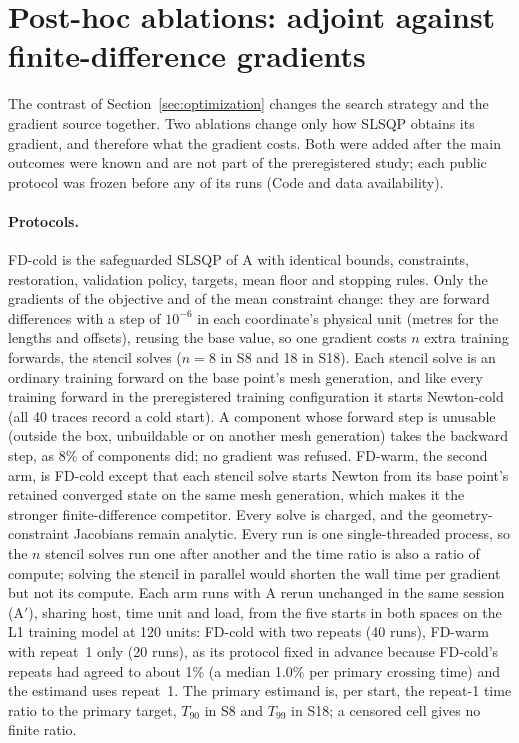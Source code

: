 \section{Post-hoc ablations: adjoint against finite-difference gradients}\label{sec:exp2-fd}
The contrast of Section~\ref{sec:optimization} changes the search strategy
and the gradient source together. Two ablations change only how SLSQP
obtains its gradient, and therefore what the gradient costs. Both were
added after the main outcomes were known and are not part of the
preregistered study; each public protocol was frozen before any of its
runs (Code and data availability).

\paragraph{Protocols.}
FD-cold is the safeguarded SLSQP of A with identical bounds, constraints,
restoration, validation policy, targets, mean floor and stopping rules.
Only the gradients of the objective and of the mean constraint change: they
are forward differences with a step of $10^{-6}$ in each coordinate's
physical unit (metres for the lengths and offsets), reusing the base value,
so one gradient costs $n$ extra training forwards, the stencil solves
($n=8$ in S8 and 18 in S18). Each stencil solve is an ordinary training
forward on the base point's mesh generation, and like every training
forward in the preregistered training configuration it starts Newton-cold
(all 40 traces record a cold start). A component whose forward step is
unusable (outside the box, unbuildable or on another mesh generation) takes
the backward step, as 8\% of components did; no gradient was refused.
FD-warm, the second arm, is FD-cold except that each stencil solve starts
Newton from its base point's retained converged state on the same mesh
generation, which makes it the stronger finite-difference competitor.
Every solve is charged, and the geometry-constraint Jacobians remain
analytic. Every run is one single-threaded process, so the $n$ stencil
solves run one after another and the time ratio is also a ratio of
compute; solving the stencil in parallel would shorten the wall time per
gradient but not its compute. Each arm runs with A rerun unchanged in the
same session (A$'$), sharing host, time unit and load, from the five starts
in both spaces on the L1 training model at 120 units: FD-cold with two
repeats (40 runs), FD-warm with repeat~1 only (20 runs), as its protocol
fixed in advance because FD-cold's repeats had agreed to about 1\% (a
median 1.0\% per primary crossing time) and the estimand uses repeat~1. The
primary estimand is, per start, the repeat-1 time ratio to the primary
target, $T_{90}$ in S8 and $T_{99}$ in S18; a censored cell gives no
finite ratio.

